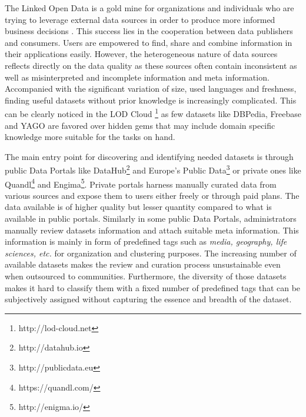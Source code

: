 \documentclass[runningheads,a4paper]{llncs}
\begin{document}
The Linked Open Data is a gold mine for organizations and individuals who are trying to leverage external data sources in order to produce more informed business decisions \cite{Boyd2011}. This success lies in the cooperation between data publishers and consumers. Users are empowered to find, share and combine information in their applications easily. However, the heterogeneous nature of data sources reflects directly on the data quality as these sources often contain inconsistent as well as misinterpreted and incomplete information and meta information. Accompanied with the significant variation of size, used languages and freshness, finding useful datasets without prior knowledge is increasingly complicated. This can be clearly noticed in the LOD Cloud \footnote{http://lod-cloud.net} as few datasets like DBPedia\cite{Bizer:2009:DCP:1640541.1640848}, Freebase\cite{Bollacker:2008:FCC:1376616.1376746} and YAGO\cite{Suchanek:2007:YCS:1242572.1242667} are favored over hidden gems that may include domain specific knowledge more suitable for the tasks on hand.

The main entry point for discovering and identifying needed datasets is through public Data Portals like DataHub\footnote{http://datahub.io} and Europe's Public Data\footnote{http://publicdata.eu} or private ones like Quandl\footnote{https://quandl.com/} and Engima\footnote{http://enigma.io/}. Private portals harness manually curated data from various sources and expose them to users either freely or through paid plans. The data available is of higher quality but lesser quantity compared to what is available in public portals. Similarly in some public Data Portals, administrators manually review datasets information and attach suitable meta information. This information is mainly in form of predefined tags such as \textit{media, geography, life sciences, etc.} for organization and clustering purposes.
The increasing number of available datasets makes the review and curation process unsustainable even when outsourced to communities. Furthermore, the diversity of those datasets makes it hard to classify them with a fixed number of predefined tags that can be subjectively assigned without capturing the essence and breadth of the dataset\cite{6690016}.
\end{document}
